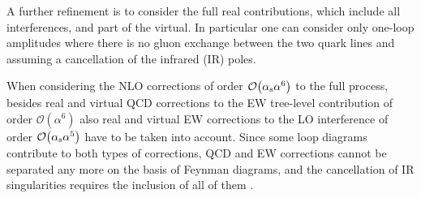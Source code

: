 A further refinement is to consider the full real contributions, which include all interferences, and part of the virtual.
In particular one can consider only one-loop amplitudes where there is no gluon exchange between the two quark lines and 
assuming a cancellation of the infrared (IR) poles.

When considering the NLO corrections of order
$\mathcal{O}{\left(\alpha_{\rm s}\alpha^{6}\right)}$
to the full process, besides real and virtual QCD corrections
to the EW tree-level contribution of order
$\mathcal{O}{\left(\alpha^{6}\right)}$
also real and virtual EW corrections to the LO interference
of order $\mathcal{O}{\left(\alpha_{\rm s}\alpha^{5}\right)}$
have to be taken into account. Since some loop diagrams contribute
to both types of corrections, QCD and EW corrections cannot be
separated any more on the basis of Feynman diagrams, and the
cancellation of IR singularities requires the inclusion of all of them \cite{Biedermann:2017bss}.
